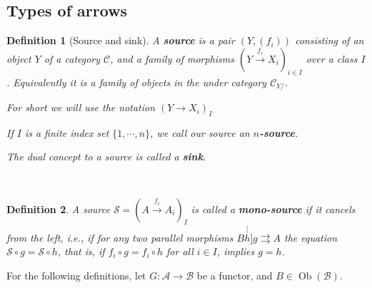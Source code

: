 \documentclass[12pt,a4paper]{article}
\newtheorem{definition}{Definition}[section] %
\DeclareMathOperator{\Ob}{Ob}
\begin{document}
\subsection{Types of arrows}
\begin{definition}[Source and sink]
	 A \textbf{source} is a pair $(Y, (f_i))$ consisting of an object $Y$  of a category $\mathcal{C}$, and a family of morphisms $(Y \stackrel{f_i}{\to} X_i)_{i \in I}$ over a class $I$. Equivalently it is a family of objects in the under category  $\mathcal{C}_{Y/}$. 
	 
	 For short we will use the notation $(Y \to X_i)_I$
	 
	 If $I$ is a finite index set $\{1, \cdots, n\}$, we call our source an \textbf{$n$-source}. 
	 
	 The dual concept to a source is called a \textbf{sink}. 
	 \\
\end{definition}
\
\begin{definition}
	A source $\mathcal{S} = (A \stackrel{f_i}{\to}A_i)_I$ is called a \textbf{mono-source} if it cancels from the left, i.e., if for any two parallel morphisms $B \stackrel[h]{g}{\rightrightarrows A}$ the equation $ \mathcal{S} \circ g = \mathcal{S} \circ h$, that is, if $f_i \circ g = f_i \circ h$ for all $i \in I$, implies $g = h$.
\end{definition}
For the following definitions, let $G: \mathcal{A} \to \mathcal{B}$ be a functor, and $B \in \Ob(\mathcal{B})$.

\
\end{document}
